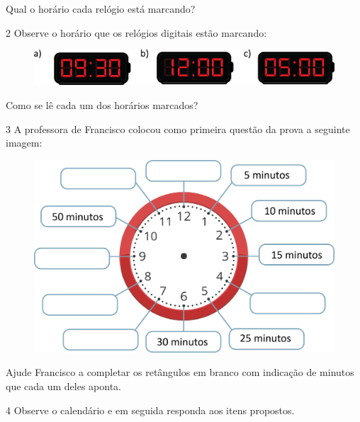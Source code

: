Qual o horário cada relógio está marcando?

\num{2} Observe o horário que os relógios digitais estão marcando:

\begin{figure}[htpb!]
\includegraphics[width=\textwidth]{./media/image52.png}
\end{figure}

Como se lê cada um dos horários marcados?

\num{3} A professora de Francisco colocou como primeira questão da prova a seguinte imagem:

\begin{figure}[htpb!]
\centering
\includegraphics[width=\textwidth]{./media/image53.png}
\end{figure}

Ajude Francisco a completar os retângulos em branco com indicação de
minutos que cada um deles aponta.


\num{4} Observe o calendário e em seguida responda aos itens propostos.

